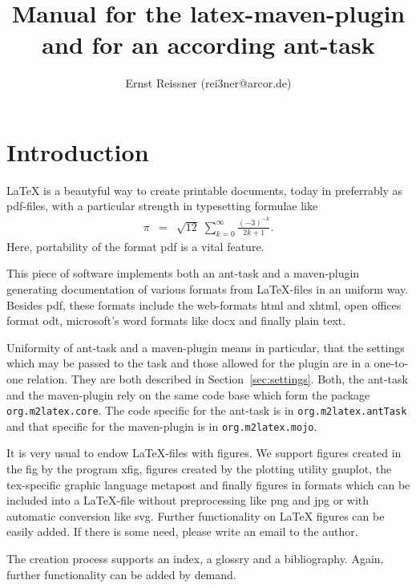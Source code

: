 \documentclass[12pt]{article}
\title{Manual for the latex-maven-plugin and for an according ant-task }
\author{Ernst Reissner (rei3ner@arcor.de)}
\begin{document}
\maketitle

\tableofcontents
\listoffigures
\listoftables


\section{Introduction}

\LaTeX{} is a beautyful way to create printable documents, 
today in preferrably as \gls{pdf}-files, 
with a particular strength in typesetting formulae like 
%
\begin{eqnarray*}
\pi & = & \sqrt{12}\;\sum^\infty_{k=0} \frac{(-3)^{-k}}{2k+1}. 
\end{eqnarray*}
%
Here, portability of the format \gls{pdf} is a vital feature. 

This piece of software implements both an ant-task and a maven-plugin 
generating documentation of various formats from \LaTeX-files 
in an uniform way. 
Besides \gls{pdf}, these formats include the web-formats \gls{html} 
and \gls{xhtml}, 
open offices format \gls{odt}, microsoft's word formats like \gls{docx} 
and finally plain text. 

Uniformity of ant-task and a maven-plugin means in particular, 
that the settings which may be passed to the task 
and those allowed for the plugin are in a one-to-one relation. 
They are both described in Section~\ref{sec:settings}. 
Both, the ant-task and the maven-plugin rely on the same code base 
which form the package {\tt org.m2latex.core}. 
The code specific for the ant-task is in {\tt org.m2latex.antTask} 
and that specific for the maven-plugin is in {\tt org.m2latex.mojo}. 

It is very usual to endow \LaTeX-files with figures. 
We support figures created in the \gls{fig} by the program xfig, 
figures created by the plotting utility gnuplot, 
the tex-specific graphic language metapost 
and finally figures in formats which can be included into a \LaTeX-file 
without preprocessing like \gls{png} and \gls{jpg} 
or with automatic conversion like \gls{svg}. 
Further functionality on \LaTeX{} figures can be easily added. 
If there is some need, please write an email to the author. 

The creation process supports an index, a glossry and a bibliography. 
Again, further functionality can be added by demand. 
\end{document}
